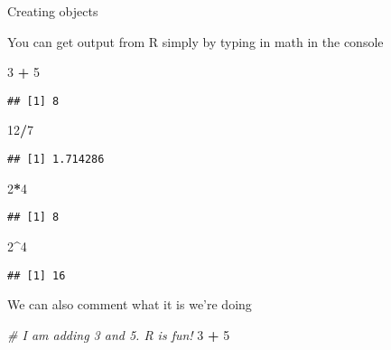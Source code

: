 \documentclass[
  11pt,
  ignorenonframetext,
]{beamer}
\newenvironment{Shaded}{\begin{snugshade}}{\end{snugshade}}
\newcommand{\CommentTok}[1]{\textcolor[rgb]{0.56,0.35,0.01}{\textit{#1}}}
\newcommand{\DecValTok}[1]{\textcolor[rgb]{0.00,0.00,0.81}{#1}}
\newcommand{\OperatorTok}[1]{\textcolor[rgb]{0.81,0.36,0.00}{\textbf{#1}}}
\newcommand{\StringTok}[1]{\textcolor[rgb]{0.31,0.60,0.02}{#1}}
\begin{document}
\begin{frame}[fragile]{Creating objects}
\protect\hypertarget{creating-objects}{}

You can get output from R simply by typing in math in the console

\begin{Shaded}
\begin{Highlighting}[]
\DecValTok{3} \OperatorTok{+}\StringTok{ }\DecValTok{5}
\end{Highlighting}
\end{Shaded}

\begin{verbatim}
## [1] 8
\end{verbatim}

\begin{Shaded}
\begin{Highlighting}[]
\DecValTok{12}\OperatorTok{/}\DecValTok{7}
\end{Highlighting}
\end{Shaded}

\begin{verbatim}
## [1] 1.714286
\end{verbatim}

\begin{Shaded}
\begin{Highlighting}[]
\DecValTok{2}\OperatorTok{*}\DecValTok{4}
\end{Highlighting}
\end{Shaded}

\begin{verbatim}
## [1] 8
\end{verbatim}

\begin{Shaded}
\begin{Highlighting}[]
\DecValTok{2}\OperatorTok{^}\DecValTok{4}
\end{Highlighting}
\end{Shaded}

\begin{verbatim}
## [1] 16
\end{verbatim}

We can also comment what it is we're doing

\begin{Shaded}
\begin{Highlighting}[]
\CommentTok{# I am adding 3 and 5. R is fun!}
\DecValTok{3} \OperatorTok{+}\StringTok{ }\DecValTok{5}
\end{Highlighting}
\end{Shaded}


\end{frame}
\end{document}
